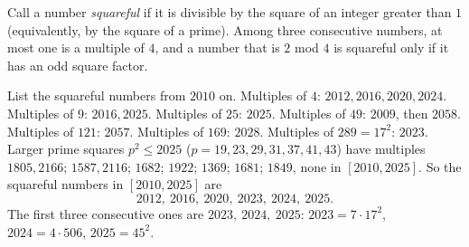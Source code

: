 Call a number \emph{squareful} if it is divisible by the square of an integer greater than $1$ (equivalently, by the square of a prime). Among three consecutive numbers, at most one is a multiple of $4$, and a number that is $2$ mod $4$ is squareful only if it has an odd square factor.

List the squareful numbers from $2010$ on. Multiples of $4$: $2012,2016,2020,2024$. Multiples of $9$: $2016,2025$. Multiples of $25$: $2025$. Multiples of $49$: $2009$, then $2058$. Multiples of $121$: $2057$. Multiples of $169$: $2028$. Multiples of $289=17^2$: $2023$. Larger prime squares $p^2\le2025$ ($p=19,23,29,31,37,41,43$) have multiples $1805,2166$; $1587,2116$; $1682$; $1922$; $1369$; $1681$; $1849$, none in $[2010,2025]$. So the squareful numbers in $[2010,2025]$ are
\[
2012,\ 2016,\ 2020,\ 2023,\ 2024,\ 2025 .
\]
The first three consecutive ones are $\boxed{2023,\ 2024,\ 2025}$: $2023=7\cdot17^2$, $2024=4\cdot506$, $2025=45^2$.
